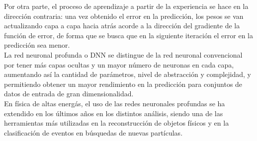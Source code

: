 Por otra parte, el proceso de aprendizaje a partir de la experiencia se hace en la direcci\'on contraria: una vez obtenido el error en la predicci\'on, los pesos se van actualizando capa a capa hacia atr\'as acorde a la direcci\'on del gradiente de la funci\'on de error, de forma que se busca que en la siguiente iteraci\'on el error en la predicci\'on sea menor. \\

La red neuronal profunda o DNN se distingue de la red neuronal convencional por tener m\'as capas ocultas y un mayor n\'umero de neuronas en cada capa, aumentando as\'i la cantidad de par\'ametros, nivel de abstracci\'on y complejidad, y permitiendo obtener un mayor rendimiento en la predicci\'on para conjuntos de datos de entrada de gran dimensionalidad. \\

En f\'isica de altas energ\'as, el uso de las redes neuronales profundas se ha extendido en los \'ultimos a\~nos en los distintos an\'alisis, siendo una de las herramientas m\'as utilizadas en la reconstrucci\'on de objetos f\'isicos y en la clasificaci\'on de eventos en b\'usquedas de nuevas part\'iculas.
